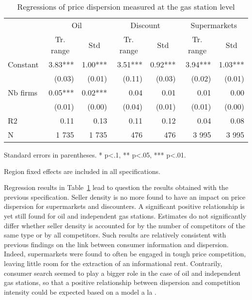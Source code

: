 \documentclass[english]{article}
\begin{document}
\begin{table}[H]
\caption{Regressions of price dispersion measured at the gas station level}
\label{tab:station_price_support_regs}
\begin{threeparttable}
\begin{tabular}{lrrrrrr}
    \toprule
    \toprule
          & \multicolumn{2}{c}{Oil} & \multicolumn{2}{c}{Discount} & \multicolumn{2}{c}{Supermarkets} \\
          & \multicolumn{1}{c}{Tr. range} & \multicolumn{1}{c}{Std} & \multicolumn{1}{c}{Tr. range} & \multicolumn{1}{c}{Std} & \multicolumn{1}{c}{Tr. range} & \multicolumn{1}{c}{Std} \\
    \midrule
    Constant & 3.83*** & 1.00*** & 3.51*** & 0.92*** & 3.94*** & 1.03*** \\
          & (0.03) & (0.01) & (0.11) & (0.03) & (0.02) & (0.01) \\
    Nb firms & 0.05*** & 0.02*** & 0.04  & 0.01  & 0.01  & 0.00 \\
          & (0.01) & (0.00) & (0.04) & (0.01) & (0.01) & (0.00) \\
    \midrule
    R2    & 0.11  & 0.13  & 0.11  & 0.12  & 0.04  & 0.08 \\
    N     & 1 735 & 1 735 &  476  &  476  & 3 995 & 3 995 \\
    \bottomrule
    \bottomrule
\end{tabular}
\begin{tablenotes}
      \small
      \item Standard errors in parentheses. * p<.1, ** p<.05, *** p<.01.
      \item Region fixed effects are included in all specifications.
\end{tablenotes}
\end{threeparttable}
\end{table}

Regression results in Table~\ref{tab:station_price_support_regs} lead to question the results obtained with the previous specification. Seller density is no more found to have an impact on price dispersion for supermarkets and discounters. A significant positive relationship is yet still found for oil and independent gas stations. Estimates do not significantly differ whether seller density is accounted for by the number of competitors of the same type or by all competitors. Such results are relatively consistent with previous findings on the link between consumer information and dispersion. Indeed, supermarkets were found to often be engaged in tough price competition, leaving little room for the extraction of an informational rent. Contrarily, consumer search seemed to play a bigger role in the case of oil and independent gas stations, so that a positive relationship between dispersion and competition intensity could be expected based on a model a la \cite{VAR80}.
\end{document}
